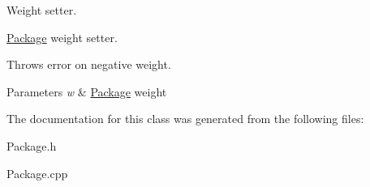 Weight setter. 

\hyperlink{classPackage}{Package} weight setter.

Throws error on negative weight. 
\begin{DoxyParams}{Parameters}
{\em w} & \hyperlink{classPackage}{Package} weight \\
\hline
\end{DoxyParams}


The documentation for this class was generated from the following files\+:\begin{DoxyCompactItemize}
\item 
Package.\+h\item 
Package.\+cpp\end{DoxyCompactItemize}
